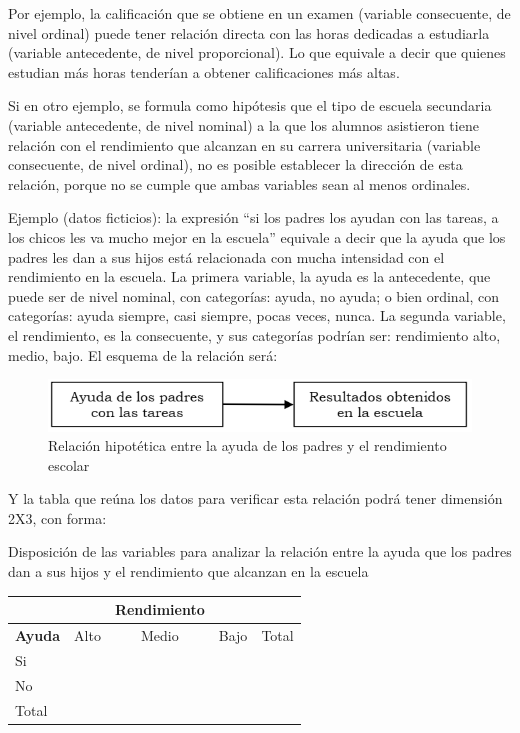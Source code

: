 \documentclass[]{book}
\begin{document}
Por ejemplo, la calificación que se obtiene en un examen (variable
consecuente, de nivel ordinal) puede tener relación directa con las
horas dedicadas a estudiarla (variable antecedente, de nivel
proporcional). Lo que equivale a decir que quienes estudian más horas
tenderían a obtener calificaciones más altas.

Si en otro ejemplo, se formula como hipótesis que el tipo de escuela
secundaria (variable antecedente, de nivel nominal) a la que los alumnos
asistieron tiene relación con el rendimiento que alcanzan en su
carrera universitaria (variable consecuente, de nivel ordinal), no es
posible establecer la dirección de esta relación, porque no se cumple
que ambas variables sean al menos ordinales.

Ejemplo (datos ficticios): la expresión ``si los padres los ayudan con
las tareas, a los chicos les va mucho mejor en la escuela'' equivale a
decir que la ayuda que los padres les dan a sus hijos está relacionada con mucha intensidad con el rendimiento en la escuela. La primera variable, la ayuda es la antecedente, que puede ser de nivel nominal, con categorías: ayuda, no ayuda; o bien ordinal, con categorías: ayuda siempre, casi siempre, pocas veces, nunca. La segunda variable, el rendimiento, es la consecuente, y sus categorías podrían ser: rendimiento alto, medio, bajo. El esquema de la relación
será:

\begin{figure}

{\centering \includegraphics{imagenes/ayudapadres} 

}

\caption{Relación hipotética entre la ayuda de los padres y el rendimiento escolar}\label{fig:unnamed-chunk-106}
\end{figure}

Y la tabla que reúna los datos para verificar esta relación podrá tener
dimensión 2X3, con forma:

Disposición de las variables para analizar la relación entre la ayuda
que los padres dan a sus hijos y el rendimiento que alcanzan en la
escuela

\begin{longtable}[]{@{}llcll@{}}
\toprule
& & Rendimiento & &\tabularnewline
\midrule
\endhead
\textbf{Ayuda} & Alto & Medio & Bajo & Total\tabularnewline
Si & & & &\tabularnewline
No & & & &\tabularnewline
Total & & & &\tabularnewline
\bottomrule
\end{longtable}
\end{document}
